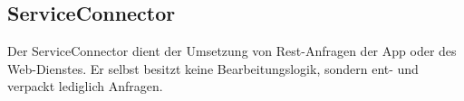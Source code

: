 \subsection{ServiceConnector} \label{service:modul:ServiceConnector}
Der ServiceConnector dient der Umsetzung von Rest-Anfragen der App oder des Web-Dienstes. Er selbst besitzt keine Bearbeitungslogik, sondern ent- und verpackt lediglich Anfragen.